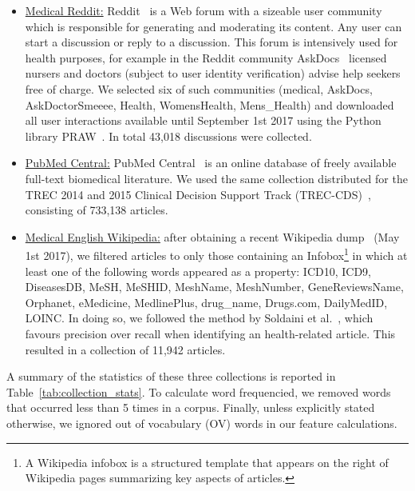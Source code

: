 \begin{itemize}
\item \underline{Medical Reddit:} Reddit~\cite{reddit} is a Web forum with a sizeable user community which is responsible for generating and moderating its content. Any user can start a discussion or reply to a discussion. This forum is intensively used for health purposes, for example in the Reddit community AskDocs~\cite{redditaskdocs} licensed nursers and doctors (subject to user identity verification) advise help seekers free of charge. We selected six of such communities
    (medical, AskDocs, AskDoctorSmeeee, Health, WomensHealth, Mens\_Health) and downloaded all user interactions available until September 1st 2017 using the Python library PRAW~\cite{redditapi}. In total 43,018 discussions were collected.



\item \underline{PubMed Central:} PubMed Central~\cite{pubmed} is an online  database of freely available full-text biomedical literature. We used the same collection distributed for the TREC 2014 and 2015 Clinical Decision Support Track (TREC-CDS)~\cite{roberts16,trec15}, consisting of 733,138 articles. 
 
\item \underline{Medical English Wikipedia:} after obtaining a recent  Wikipedia dump~\cite{wikipedia} (May 1st 2017), we filtered articles to only those  containing an Infobox\footnote{A Wikipedia infobox is a structured template that appears on the right of Wikipedia pages summarizing key aspects of articles.} in which at least one of the following words appeared as a property: ICD10, ICD9, DiseasesDB, MeSH, MeSHID, MeshName, MeshNumber, GeneReviewsName, Orphanet, eMedicine, MedlinePlus, drug\_name, Drugs.com, DailyMedID, LOINC.
In doing so, we followed the method by Soldaini et al.~\cite{soldaini15}, which favours precision over recall when identifying an health-related article. This resulted in a collection of 11,942 articles. 
\end{itemize}

A summary of the statistics of these three collections is reported in Table~\ref{tab:collection_stats}. To calculate word frequencied, we removed words that occurred less than 5 times in a corpus. Finally, unless explicitly stated otherwise, we ignored out of vocabulary (OV) words in our feature calculations.



